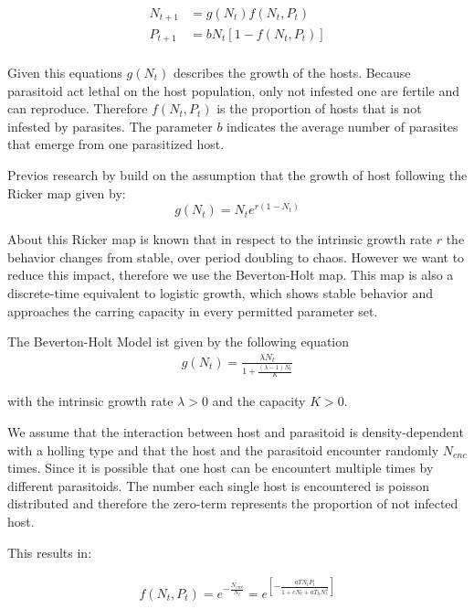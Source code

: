 \documentclass[a4paper,12pt, twoside]{article} %
\begin{document}
\begin{equation}
\begin{split}
  N_{t+1} &= g(N_t)  f(N_t,P_t) \\
  P_{t+1} &= b N_t[1- f(N_t, P_t)] \\
\end{split}
\end{equation}

Given this equations $g(N_t)$ describes the growth of the hosts. Because parasitoid act lethal on the host population, only not infested one are fertile and can reproduce. Therefore $f(N_t, P_t)$ is the proportion of hosts
that is not infested by parasites. The parameter $b$ indicates the average number of parasites that emerge from 
one parasitized host.

Previos research by \autocite[][]{Kaitala} build on the assumption that the growth of host following the Ricker map given
by:
\begin{equation}
  g(N_t)= N_t e^{r(1-N_t)}
\end{equation}

About this Ricker map is known that in respect to the intrinsic growth rate $r$ the behavior changes 
from stable, over period doubling to chaos.  However we want to reduce this impact, therefore we use 
the Beverton-Holt map. This map is also a discrete-time equivalent to 
logistic growth, which shows stable behavior and approaches the carring capacity in every permitted parameter set. 

The Beverton-Holt Model ist given by the following equation
\begin{equation}
  \begin{split}
    g(N_t) = \frac{\lambda N_t}{1 + \frac{(\lambda -1)N_t}{K}}
  \end{split}
\end{equation}

with the intrinsic growth rate $\lambda > 0$  and the capacity $K > 0$.

We assume that the interaction between host and parasitoid is density-dependent with a holling type
 and that the host and the parasitoid encounter randomly $N_{enc}$ times. 
Since it is possible that one host can be encountert multiple times by different parasitoids.
 The number each single host is encountered is poisson distributed and
 therefore the zero-term represents the proportion of not infected host.
 
 This results in:

\begin{equation}
  \begin{split}
    f(N_t, P_t) = e^{- \frac{N_{enc}}{N_t}} =e^{\left[- \frac{aTN_t P_t}{1+cN_t+aT_h N_t^2} \right]} 
  \end{split}
\end{equation}
\end{document}
